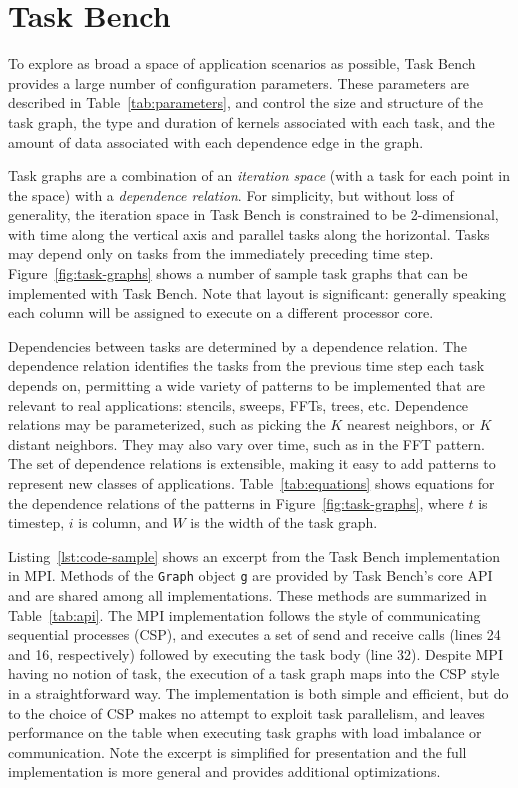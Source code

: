 \section{Task Bench}
\label{sec:task-bench}



To explore as broad a space of application scenarios as possible, Task
Bench provides a large number of configuration parameters. These
parameters are described in
Table~\ref{tab:parameters}, and control the size and
structure of the task graph, the type and duration of kernels
associated with each task, and the amount of data associated with
each dependence edge in the graph.

Task graphs are a combination of an \emph{iteration space} (with a task for
each point in the space) with a \emph{dependence relation}.
For simplicity, but without loss of generality, the iteration space in
Task Bench is constrained to be 2-dimensional, with time along
the vertical axis and parallel tasks along the
horizontal. Tasks may depend only on tasks from the immediately
preceding time step. Figure~\ref{fig:task-graphs} shows a number of sample task
graphs that can be implemented with Task Bench. Note that layout is
significant: generally speaking each column will be
assigned to execute on a different processor core.

Dependencies between tasks are determined by a dependence
relation. The
dependence relation identifies the tasks from the
previous time step each task depends on, permitting a wide variety
of patterns to be implemented that are relevant to real
applications: stencils,
sweeps, FFTs, trees, etc. Dependence relations may be
parameterized, such as picking the $K$ nearest neighbors, or $K$
distant neighbors. They may also vary over time, such as in the FFT pattern. The set of dependence relations is extensible, making it easy to add patterns to represent new classes of applications. Table~\ref{tab:equations} shows equations for the
dependence relations of the patterns in Figure~\ref{fig:task-graphs},
where $t$ is timestep, $i$ is column, and $W$ is the width of the task
graph.




Listing~\ref{lst:code-sample} shows an excerpt from the Task Bench
implementation in MPI. Methods of the \lstinline{Graph} object
\lstinline{g} are provided by Task Bench's core API and are shared
among all implementations. These methods are summarized in
Table~\ref{tab:api}. The MPI implementation follows the style of
communicating sequential processes (CSP), and executes a set of send
and receive calls (lines 24 and 16, respectively) followed by
executing the task body (line 32). Despite MPI having no notion of
task, the execution of a task graph maps into the CSP style in a
straightforward way. The implementation is both simple and efficient,
but do to the choice of CSP makes no attempt to exploit task
parallelism, and leaves performance on the table when executing task
graphs with load imbalance or communication. Note the excerpt is
simplified for presentation and the full implementation is more
general and provides additional optimizations.

